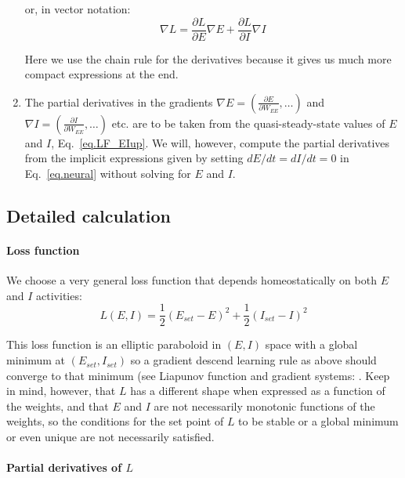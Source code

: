 \documentclass[
twocolumn,
]{article}
\newcommand{\set}{\mathit{set}}
\begin{document}
\begin{enumerate}
\noindent or, in vector notation:
\begin{equation}
\nabla L = \frac{\partial L}{\partial E} \nabla E + \frac{\partial L}{\partial I} \nabla I
\label{eq.LF_partial}
\end{equation}

\noindent Here we use the chain rule for the derivatives because it gives us much more compact expressions at the end.

\item The partial derivatives in the gradients $\displaystyle \nabla E = \left(\frac{\partial E}{\partial W_{EE}}, \ldots \right)$ and $\displaystyle \nabla I = \left( \frac{\partial I}{\partial W_{EE}}, \ldots \right)$ etc. are to be taken from the quasi-steady-state values of $E$ and $I$, Eq.\ \ref{eq.LF_EIup}. We will, however, compute the partial derivatives from the implicit expressions given by setting $dE/dt=dI/dt=0$ in Eq.\ \ref{eq.neural} without solving for $E$ and $I$.
\end{enumerate}


\subsection{Detailed calculation}

\paragraph{Loss function}

We choose a very general loss function that depends homeostatically on both $E$ and $I$ activities:
\begin{equation}
L(E,I) = \frac{1}{2}(E_{set} - E)^2 + \frac{1}{2}(I_{set} - I)^2
\label{eq.LF_energy}
\end{equation}

\noindent This loss function is an elliptic paraboloid in $(E,I)$ space with a global minimum at $(E_{\set},I_{\set})$ so a gradient descend learning rule as above should converge to that minimum (see Liapunov function and gradient systems: \cite[Section 1.1B]{Wiggins1996}\cite[Sections 9.3 and 9.4]{Hirsch1974}\cite[Section 7.2]{Strogatz2018}. Keep in mind, however, that $L$ has a different shape when expressed as a function of the weights, and that $E$ and $I$ are not necessarily monotonic functions of the weights, so the conditions for the set point of $L$ to be stable or a global minimum or even unique are not necessarily satisfied.


\paragraph{Partial derivatives of $L$}
\end{document}
